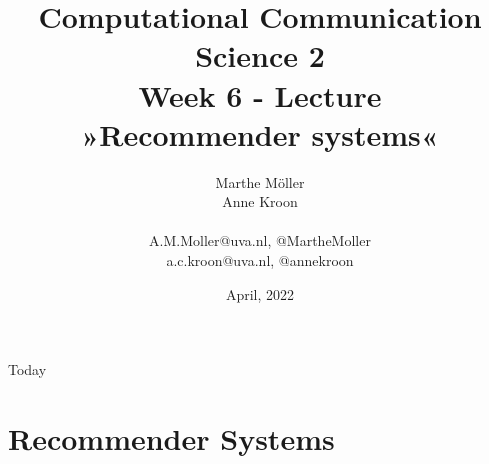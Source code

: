 \documentclass[compress]{beamer}
\title[Computational Communication Science 2]{\textbf{Computational Communication Science 2} \\Week 6 - Lecture\\ »Recommender systems«}
\author[Marthe Möller, Anne Kroon]{Marthe Möller \\ Anne Kroon \\ ~ \\ \footnotesize{A.M.Moller@uva.nl, @MartheMoller \\a.c.kroon@uva.nl, @annekroon} \\}
\date{April, 2022}
\institute[Digital Society Minor, University of Amsterdam]{Digital Society Minor, University of Amsterdam}
\begin{document}
	
	\begin{frame}{}
		\titlepage
	\end{frame}
	
	\begin{frame}{Today}
		\tableofcontents
	\end{frame}

\section{Recommender Systems}


\begin{frame}
\end{frame}

\end{document}
